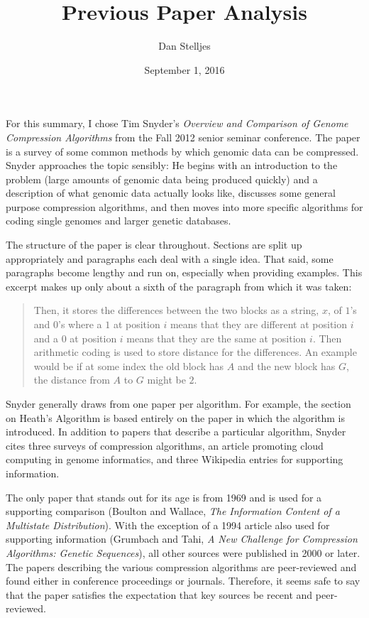 \documentclass[12pt,letterpaper]{article}
\author{Dan Stelljes}
\date{September 1, 2016}
\title{Previous Paper Analysis}
\begin{document}
\maketitle

For this summary, I chose Tim Snyder's \emph{Overview and Comparison of Genome Compression Algorithms} from the Fall 2012 senior seminar conference. The paper is a survey of some common methods by which genomic data can be compressed. Snyder approaches the topic sensibly: He begins with an introduction to the problem (large amounts of genomic data being produced quickly) and a description of what genomic data actually looks like, discusses some general purpose compression algorithms, and then moves into more specific algorithms for coding single genomes and larger genetic databases.

The structure of the paper is clear throughout. Sections are split up appropriately and paragraphs  each deal with a single idea. That said, some paragraphs become lengthy and run on, especially when providing examples. This excerpt makes up only about a sixth of the paragraph from which it was taken:
\begin{quote}
Then, it stores the differences between the two blocks as a string, $x$, of $1$'s and $0$'s where a $1$ at position $i$ means that they are different at position $i$ and a $0$ at position $i$ means that they are the same at position $i$. Then arithmetic coding is used to store distance for the differences. An example would be if at some index the old block has $A$ and the new block has $G$, the distance from $A$ to $G$ might be $2$. \cite{snyder2012}
\end{quote}

Snyder generally draws from one paper per algorithm. For example, the section on Heath's Algorithm is based entirely on the paper in which the algorithm is introduced. In addition to papers that describe a particular algorithm, Snyder cites three surveys of compression algorithms, an article promoting cloud computing in genome informatics, and three Wikipedia entries for supporting information.

The only paper that stands out for its age is from 1969 and is used for a supporting comparison (Boulton and Wallace, \emph{The Information Content of a Multistate Distribution}). With the exception of a 1994 article also used for supporting information (Grumbach and Tahi, \emph{A New Challenge for Compression Algorithms: Genetic Sequences}), all other sources were published in 2000 or later. The papers describing the various compression algorithms are peer-reviewed and found either in conference proceedings or journals. Therefore, it seems safe to say that the paper satisfies the expectation that key sources be recent and peer-reviewed.
\end{document}
